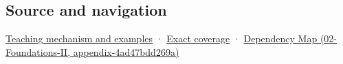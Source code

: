 \subsection{Source and navigation}\label{appendix-ba8c1a9fe03f-source-and-navigation}

\hyperref[01-foundations-i-ch003-empty-syntax-does-not-promise-initialized-members]{Teaching mechanism and examples} · \hyperref[appendix-fd090d982a15-m009---parts-127-147]{Exact coverage} · \href{../02-Foundations-II/main.pdf\#nameddest=appendix-4ad47bdd269a}{Dependency Map (02-Foundations-II, appendix-4ad47bdd269a)}
